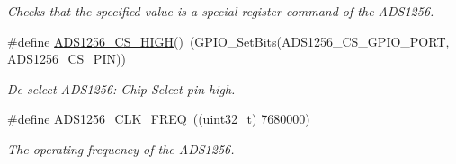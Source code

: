 \begin{DoxyCompactItemize}
\begin{DoxyCompactList}\small\item\em Checks that the specified value is a special register command of the A\-D\-S1256. \end{DoxyCompactList}\item 
\hypertarget{group__ads1256__driver_ga0c9c039ac03ad1280102b1f05c056071}{\#define \hyperlink{group__ads1256__driver_ga0c9c039ac03ad1280102b1f05c056071}{A\-D\-S1256\-\_\-\-C\-S\-\_\-\-H\-I\-G\-H}()~(G\-P\-I\-O\-\_\-\-Set\-Bits(A\-D\-S1256\-\_\-\-C\-S\-\_\-\-G\-P\-I\-O\-\_\-\-P\-O\-R\-T, A\-D\-S1256\-\_\-\-C\-S\-\_\-\-P\-I\-N))}\label{group__ads1256__driver_ga0c9c039ac03ad1280102b1f05c056071}

\begin{DoxyCompactList}\small\item\em De-\/select A\-D\-S1256\-: Chip Select pin high. \end{DoxyCompactList}\item 
\hypertarget{group__ads1256__driver_ga1fa41750fbcecde7e22785ff60fa68bb}{\#define \hyperlink{group__ads1256__driver_ga1fa41750fbcecde7e22785ff60fa68bb}{A\-D\-S1256\-\_\-\-C\-L\-K\-\_\-\-F\-R\-E\-Q}~((uint32\-\_\-t) 7680000)}\label{group__ads1256__driver_ga1fa41750fbcecde7e22785ff60fa68bb}

\begin{DoxyCompactList}\small\item\em The operating frequency of the A\-D\-S1256. \end{DoxyCompactList}\end{DoxyCompactItemize}
